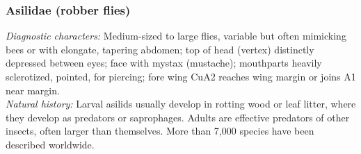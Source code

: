 \documentclass[letterpaper, 11pt]{article}
\begin{document}
\subsubsection{Asilidae (robber flies)}
\noindent{}\textit{Diagnostic characters:} Medium-sized to large flies, variable but often mimicking bees or with elongate, tapering abdomen; top of head (vertex) distinctly depressed between eyes; face with mystax (mustache); mouthparts heavily sclerotized, pointed, for piercing; fore wing CuA2 reaches wing margin or joins A1 near margin.\\

\noindent{}\textit{Natural history:} Larval asilids usually develop in rotting wood or leaf litter, where they develop as predators or saprophages. Adults are effective predators of other insects, often larger than themselves. More than 7,000 species have been described worldwide.
\end{document}
